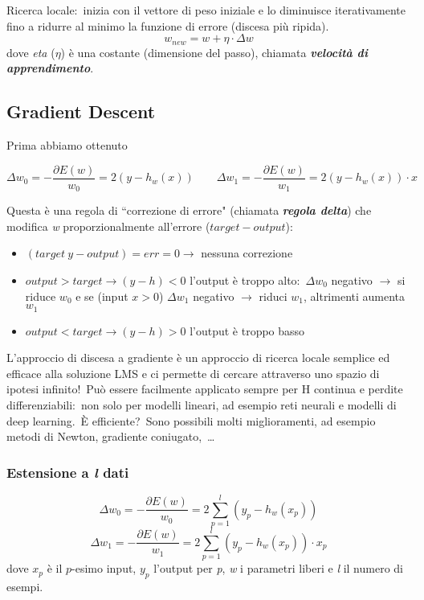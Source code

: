 \vspace{12pt}

\noindent Ricerca locale:\ inizia con il vettore di peso iniziale e lo diminuisce iterativamente fino a ridurre al minimo la funzione di errore (discesa più ripida).\
\[w_{new} = w + \eta \cdot \Delta w\]
dove \textit{eta} ($\eta$) è una costante (dimensione del passo), chiamata \textbf{\textit{velocità di apprendimento}}.\

\subsection{Gradient Descent}
Prima abbiamo ottenuto

\[\Delta w_0 = - \frac{\partial E(w)}{w_0} = 2(y-h_w(x)) \qquad \Delta w_1 = - \frac{\partial E(w)}{w_1} = 2(y-h_w(x))\cdot x \]

\noindent Questa è una regola di ``correzione di errore" (chiamata \textbf{\textit{regola delta}}) che modifica \textit{w} proporzionalmente all'errore ($target-output$):
\begin{itemize}
	\item $(target\ y - output) = err = 0 \rightarrow$ nessuna correzione
	\item $output > target \rightarrow (y-h) < 0$ l'output è troppo alto:\ $\Delta w_0$ negativo $\rightarrow$ si riduce  $w_0$ e se (input $x>0$) $\Delta w_1$ negativo $\rightarrow$ riduci $w_1$, altrimenti aumenta $w_1$
	\item $output < target \rightarrow (y-h)> 0$ l'output è troppo basso
\end{itemize}

\noindent L'approccio di discesa a gradiente è un approccio di ricerca locale semplice ed efficace alla soluzione LMS e ci permette di cercare attraverso uno spazio di ipotesi infinito!\
Può essere facilmente applicato sempre per H continua e perdite differenziabili:\ non solo per modelli lineari, ad esempio reti neurali e modelli di deep learning.\
È efficiente?\ Sono possibili molti miglioramenti, ad esempio metodi di Newton, gradiente coniugato,\ \dots

\subsubsection{Estensione a \textit{l} dati}

\[\Delta w_0 = - \frac{\partial E(w)}{w_0} = 2 \sum_{p=1}^l(y_p-h_w(x_p)) \]
\[\Delta w_1 = - \frac{\partial E(w)}{w_1} = 2\sum_{p=1}^l(y_p-h_w(x_p))\cdot x_p \]
dove $x_p$ è il $p$-esimo input, $y_p$ l'output per \textit{p}, \textit{w} i parametri liberi e \textit{l} il numero di esempi.
\vspace{12pt}

